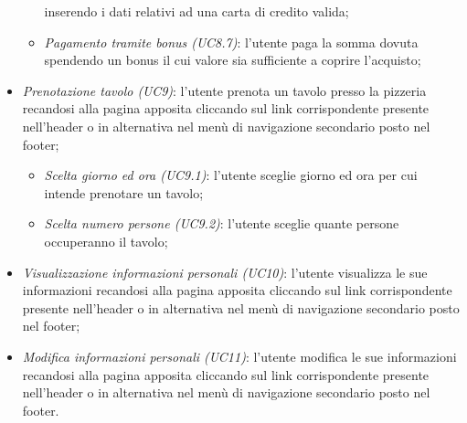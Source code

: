 \begin{itemize}
\begin{itemize}
		inserendo i dati relativi ad una carta di credito valida;
		\item \textit{Pagamento tramite bonus (UC8.7)}: l'utente paga la somma dovuta spendendo un bonus
		il cui valore sia sufficiente a coprire l'acquisto;
	\end{itemize}
	\item \textit{Prenotazione tavolo (UC9)}: l'utente prenota un tavolo presso la pizzeria recandosi
	alla pagina apposita cliccando sul link corrispondente presente
	nell'header o in alternativa nel menù di navigazione secondario posto nel footer;
	\begin{itemize}
		\item \textit{Scelta giorno ed ora (UC9.1)}: l'utente sceglie giorno ed ora per cui intende
		prenotare un tavolo;
		\item \textit{Scelta numero persone (UC9.2)}: l'utente sceglie quante persone occuperanno
		il tavolo;
	\end{itemize}
	\item \textit{Visualizzazione informazioni personali (UC10)}: l'utente visualizza le sue informazioni
	recandosi alla pagina apposita cliccando sul link corrispondente presente
	nell'header o in alternativa nel menù di navigazione secondario posto nel footer;
	\item \textit{Modifica informazioni personali (UC11)}: l'utente modifica le sue informazioni
	recandosi alla pagina apposita cliccando sul link corrispondente presente
	nell'header o in alternativa nel menù di navigazione secondario posto nel footer.
\end{itemize}

